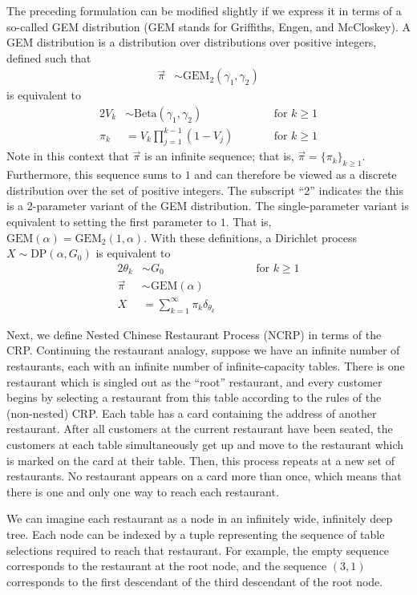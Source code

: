 \documentclass{article}
\begin{document}
The preceding formulation can be modified slightly if we express it in terms of a so-called GEM distribution (GEM stands for Griffiths, Engen, and McCloskey).
A GEM distribution is a distribution over distributions over positive integers, defined such that
\begin{align}
\vec \pi &\sim \text{GEM}_2(\gamma_1, \gamma_2)
\end{align}
is equivalent to
\begin{alignat}{2}
V_k &\sim \text{Beta}(\gamma_1, \gamma_2) &\qquad& \text{for $k \geq 1$} \\
\pi_k &= V_k \prod_{j=1}^{k-1} (1 - V_j) &\qquad& \text{for $k \geq 1$}
\end{alignat}
Note in this context that $\vec \pi$ is an infinite sequence; that is, $\vec \pi = \{ \pi_k \}_{k \geq 1}$.
Furthermore, this sequence sums to $1$ and can therefore be viewed as a discrete distribution over the set of positive integers.
The subscript ``2'' indicates the this is a 2-parameter variant of the GEM distribution.
The single-parameter variant is equivalent to setting the first parameter to $1$.
That is, $\text{GEM}(\alpha) = \text{GEM}_2(1, \alpha)$.
With these definitions, a Dirichlet process $X \sim \text{DP}(\alpha, G_0)$ is equivalent to
\begin{alignat}{2}
\theta_k &\sim G_0 &\qquad& \text{for $k \geq 1$} \\
\vec \pi &\sim \text{GEM}(\alpha) && \\
X &= \sum_{k=1}^\infty \pi_k \delta_{\theta_k} &&
\end{alignat}

Next, we define Nested Chinese Restaurant Process (NCRP) in terms of the CRP.
Continuing the restaurant analogy, suppose we have an infinite number of restaurants, each with an infinite number of infinite-capacity tables.
There is one restaurant which is singled out as the ``root'' restaurant, and every customer begins by selecting a restaurant from this table according to the rules of the (non-nested) CRP.
Each table has a card containing the address of another restaurant.
After all customers at the current restaurant have been seated, the customers at each table simultaneously get up and move to the restaurant which is marked on the card at their table.
Then, this process repeats at a new set of restaurants.
No restaurant appears on a card more than once, which means that there is one and only one way to reach each restaurant.

We can imagine each restaurant as a node in an infinitely wide, infinitely deep tree.
Each node can be indexed by a tuple representing the sequence of table selections required to reach that restaurant.
For example, the empty sequence corresponds to the restaurant at the root node, and the sequence $(3, 1)$ corresponds to the first descendant of the third descendant of the root node.
\end{document}
